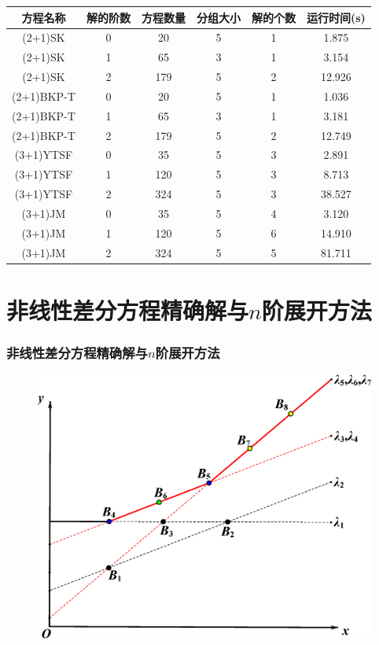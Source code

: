 \documentclass[serif]{beamer}
\begin{document}
\begin{frame}
\begin{adjustbox}{max width=\textwidth}
\renewcommand{\arraystretch}{1.3}
\begin{tabular}{cccccc}
\hline
方程名称    & 解的阶数 & 方程数量 & 分组大小 & 解的个数 & 运行时间(s) \\ 
\hline 
(2+1)SK & 0 & 20 & 5 & 1 & 1.875 \\
(2+1)SK & 1 & 65 & 3 & 1 & 3.154 \\
(2+1)SK & 2 & 179 & 5 & 2 & 12.926 \\
(2+1)BKP-T & 0 & 20 & 5 & 1 & 1.036 \\
(2+1)BKP-T & 1 & 65 & 3 & 1 & 3.181 \\
(2+1)BKP-T & 2 & 179 & 5 & 2 & 12.749 \\
(3+1)YTSF & 0 & 35 & 5 & 3 & 2.891 \\
(3+1)YTSF & 1 & 120 & 5 & 3 & 8.713 \\
(3+1)YTSF & 2 & 324 & 5 & 3 & 38.527 \\
(3+1)JM & 0 & 35 & 5 & 4 & 3.120 \\
(3+1)JM & 1 & 120 & 5 & 6 & 14.910 \\
(3+1)JM & 2 & 324 & 5 & 5 & 81.711 \\
\hline 
\end{tabular}
\end{adjustbox}
\end{frame}

\section{非线性差分方程精确解与$n$阶展开方法}
\begin{frame}
\frametitle{非线性差分方程精确解与$n$阶展开方法}
\end{frame}

\begin{frame}
\begin{figure}
\centering
\includegraphics[height=0.9\textheight]{../paper/fig/ps.eps}
\end{figure}
\end{frame}
\end{document}
